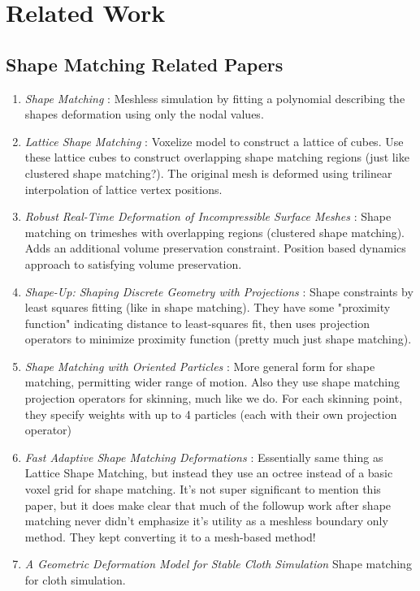 \section{Related Work}
\subsection{Shape Matching Related Papers}
\begin{enumerate}
    \item \textit{Shape Matching} \cite{10.1145/1073204.1073216}: Meshless simulation by fitting a polynomial describing the shapes deformation using only the nodal values.
    \item \textit{Lattice Shape Matching} \cite{10.1145/1275808.1276480}: Voxelize model to construct a lattice of cubes. Use these lattice cubes to construct overlapping shape matching regions (just like clustered shape matching?). The original mesh is deformed using trilinear interpolation of lattice vertex positions.
    \item \textit{Robust Real-Time Deformation of Incompressible Surface Meshes} \cite{10.1145/2019406.2019438}: Shape matching on trimeshes with overlapping regions (clustered shape matching). Adds an additional volume preservation constraint. Position based dynamics approach to satisfying volume preservation.
    \item \textit{Shape-Up: Shaping Discrete Geometry with Projections} \cite{10.1111/j.1467-8659.2012.03171.x}: Shape constraints by least squares fitting (like in shape matching). They have some "proximity function" indicating distance to least-squares fit, then uses projection operators to minimize proximity function (pretty much just shape matching). 
    \item \textit{Shape Matching with Oriented Particles} \cite{10.1145/1964921.1964987}: More general form for shape matching, permitting wider range of motion. Also they use shape matching projection operators for skinning, much like we do. For each skinning point, they specify weights with up to 4 particles (each with their own projection operator)
    \item \textit{Fast Adaptive Shape Matching Deformations} \cite{10.5555/1632592.1632606}: Essentially same thing as Lattice Shape Matching, but instead they use an octree instead of a basic voxel grid for shape matching. It's not super significant to mention this paper, but it does make clear that much of the followup work after shape matching never didn't emphasize it's utility as a meshless boundary only method. They kept converting it to a mesh-based method!
    \item \textit{A Geometric Deformation Model for Stable Cloth Simulation} \cite{10.2312/PE/vriphys/vriphys08/039-046} Shape matching for cloth simulation.
\end{enumerate}

